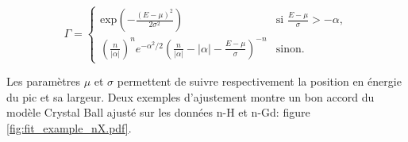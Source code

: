 \begin{equation}
    \Gamma =
    \begin{cases}
        \textrm{exp}\left( - \frac{(E - \mu)^2}{2\sigma^2} \right) &\text{si $\frac{E-\mu}{\sigma} > -\alpha$},\\
        \left(\frac{n}{|\alpha|}\right)^n e^{-\alpha^2/2} \left(\frac{n}{|\alpha|} - |\alpha| - \frac{E-\mu}{\sigma}\right)^{-n} &\text{sinon.}
    \end{cases}
\end{equation}

\bigbreak


Les paramètres $\mu$ et $\sigma$ permettent de suivre respectivement la position en énergie du pic et sa largeur. Deux exemples d'ajustement montre un bon accord du modèle Crystal Ball ajusté sur les données n-H et n-Gd: figure \ref{fig:fit_example_nX.pdf}.


